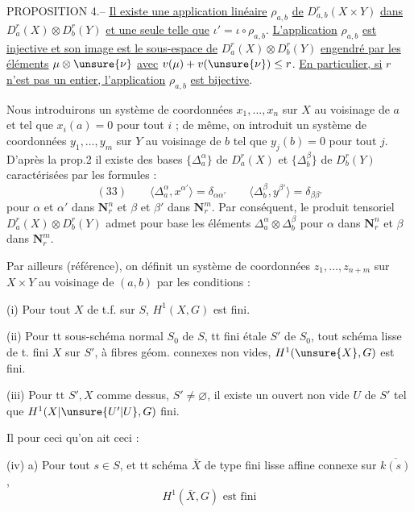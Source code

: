 PROPOSITION 4.-- \uline{Il existe une application linéaire} $\rho_{a,b}$ \uline{de} $D_{a,b}^r(X\times Y)$ \uline{dans} $D_a^r(X)\otimes D_b^r(Y)$ \uline{et une seule telle que} $\iota'=\iota\circ\rho_{a,b}$. \uline{L'application} $\rho_{a,b}$ \uline{est injective et son image est le sous-espace de} $D_a^r(X)\otimes D_b^r(Y)$ \uline{engendré par les éléments} $\mu\otimes\unsure{\nu}$ \uline{avec} $v(\mu)+v(\unsure{\nu})\leq r$. \uline{En particulier, si} $r$ \uline{n'est pas un entier, l'application} $\rho_{a,b}$ \uline{est bijective}.

Nous introduirons un système de coordonnées $x_1,\ldots,x_n$ sur $X$ au voisinage de $a$ et tel que $x_i(a)=0$ pour tout $i$ ; de même, on introduit un système de coordonnées $y_1,\ldots,y_m$ sur $Y$ au voisinage de $b$ tel que $y_j(b)=0$ pour tout $j$. D'après la prop.2 il existe des bases $\{\Delta_a^\alpha\}$ de $D_a^r(X)$ et $\{\Delta_b^\beta\}$ de $D_b^r(Y)$ caractérisées par les formules :
\[
(33)\qquad
\langle\Delta_a^\alpha,x^{\alpha'}\rangle=\delta_{\alpha\alpha'}
\qquad
\langle\Delta_b^\beta,y^{\beta'}\rangle=\delta_{\beta\beta'}
\]
pour $\alpha$ et $\alpha'$ dans $\mathbf{N}_r^n$ et $\beta$ et $\beta'$ dans $\mathbf{N}_r^m$. Par conséquent, le produit tensoriel $D_a^r(X)\otimes D_b^r(Y)$ admet pour base les éléments $\Delta_a^\alpha\otimes\Delta_b^\beta$ pour $\alpha$ dans $\mathbf{N}_r^n$ et $\beta$ dans $\mathbf{N}_r^m$.

Par ailleurs (référence), on définit un système de coordonnées $z_1,\ldots,z_{n+m}$ sur $X\times Y$ au voisinage de $(a,b)$ par les conditions :

(i) Pour tout $X$ de t.f. sur $S$, $H^1(X,G)$ est fini.

(ii) Pour tt sous-schéma  normal
$S_0$ de $S$,  tt  fini étale
$S'$ de $S_0$, tout schéma lisse de t. fini $X$ sur $S'$, à fibres géom. connexes non vides, $H^1(\unsure{X},G)$ est fini.

(iii) Pour tt $S',X$ comme dessus, $S'\neq\varnothing$, il existe un ouvert non vide $U$ de $S'$ tel que $H^1(X|\unsure{U'|U},G)$  fini.

Il  pour ceci qu'on ait ceci :

(iv) a) Pour tout $s\in S$, et tt schéma $\bar X$ de type fini lisse affine connexe sur $\overline{k(s)}$,
\[
H^1(\bar X,G)\text{ est fini}
\]

